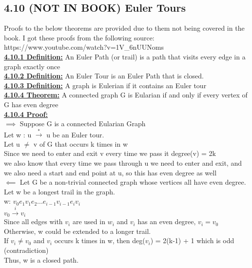 \documentclass[12pt]{article}
\newcommand{\myt}[1]{\textbf{\underline{#1}}}
\begin{document}
	\subsection*{4.10 (NOT IN BOOK) Euler Tours}
	Proofs to the below theorems are provided due to them not being covered in the book. I got these proofs from the following source:\\
	https://www.youtube.com/watch?v=1V\_6nUUNoms \\
	
	\myt{4.10.1 Definition:} An Euler Path (or trail) is a path that visits every edge in a graph exactly once\\
	\myt{4.10.2 Definition:} An Euler Tour is an Euler Path that is closed.\\
	\myt{4.10.3 Definition:} A graph is Eulerian if it contains an Euler tour\\
	
	\myt{4.10.4 Theorem:} A connected graph G is Eularian if and only if every vertex of G has even degree\\
	\myt{4.10.4 Proof:}\\
	$\implies$ Suppose G is a connected Eularian Graph\\
	Let w : u $\overset{*}{\rightarrow}$ u be an Euler tour.\\
	Let u $\neq$ v of G that occurs k times in w\\
	Since we need to enter and exit v every time we pass it degree(v) = 2k\\
	we also know that every time we pass through u we need to enter and exit, and we also need a start and end point at u, so this has even degree as well\\
	
	$\impliedby$ Let G be a non-trivial connected graph whose vertices all have even degree.\\
	
	Let w be a longest trail in the graph.\\
	w: $v_0e_1v_1e_2 ... e_{i-1}v_{i-1}e_iv_i$\\
	$v_0 \overset{i}{\rightarrow} v_i$\\
	
	Since all edges with $v_i$ are used in $w_i$ and $v_i$ has an even degree, $v_i = v_0$\\
	Otherwise, w could be extended to a longer trail.\\
	If $v_i \neq v_0$ and $v_i$ occurs k times in w, then deg($v_i$) = 2(k-1) + 1 which is odd (contradiction)\\
	Thus, w is a closed path.
	
\end{document}
